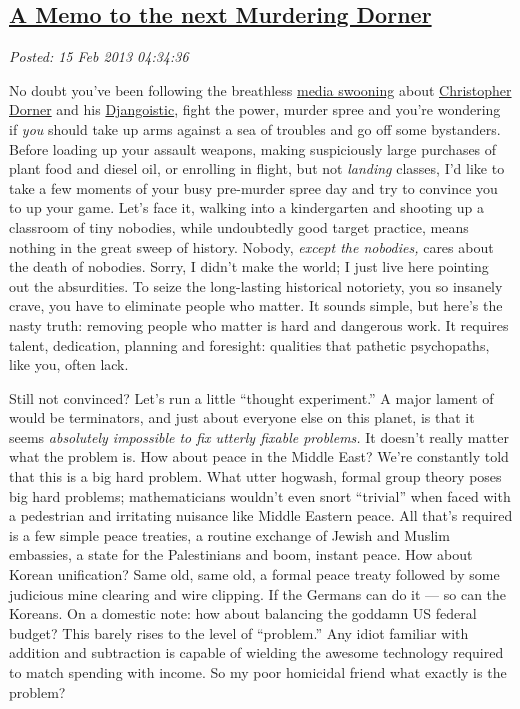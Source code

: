 %

\subsection*{\href{https://bakerjd99.wordpress.com/2013/02/14/a-memo-to-the-next-murdering-dorner/}{A Memo to the next Murdering Dorner}}


\noindent\emph{Posted: 15 Feb 2013 04:34:36}
\vspace{6pt}

No doubt you've been following the breathless
\href{http://patdollard.com/2013/02/chris-matthews-heaps-praise-on-chris-dorner-returning-favor/}{media
swooning} about
\href{http://www.thedailybeast.com/articles/2013/02/14/how-christopher-dorner-went-down.html}{Christopher
Dorner} and his
\href{http://www.mediaite.com/tv/cnn-panelists-dorners-exciting-rampage-like-watching-django-exact-revenge-for-police-brutality/}{Djangoistic},
fight the power, murder spree and you're wondering if \emph{you} 
should take up arms against a sea of troubles and go off some
bystanders. Before loading up your assault weapons, making suspiciously
large purchases of plant food and diesel oil, or enrolling in flight,
but not \emph{landing} classes, I'd like to take a few moments of your
busy pre-murder spree day and try to convince you to up your game. Let's
face it, walking into a kindergarten and shooting up a classroom of tiny
nobodies, while undoubtedly good target practice, means nothing in the
great sweep of history. Nobody, \emph{except the nobodies,} cares about
the death of nobodies. Sorry, I didn't make the world; I just live here
pointing out the absurdities. To seize the long-lasting historical
notoriety, you so insanely crave, you have to eliminate people who
matter. It sounds simple, but here's the nasty truth: removing people
who matter is hard and dangerous work. It requires talent, dedication,
planning and foresight: qualities that pathetic psychopaths, like you,
often lack.

Still not convinced? Let's run a little ``thought experiment.'' A major
lament of would be terminators, and just about everyone else on this
planet, is that it seems \emph{absolutely impossible to fix utterly
fixable problems.} It doesn't really matter what the problem is. How
about peace in the Middle East? We're constantly told that this is a big
hard problem. What utter hogwash, formal group theory poses big hard
problems; mathematicians wouldn't even snort ``trivial'' when faced with
a pedestrian and irritating nuisance like Middle Eastern peace. All
that's required is a few simple peace treaties, a routine exchange of
Jewish and Muslim embassies, a state for the Palestinians and boom,
instant peace. How about Korean unification? Same old, same old, a
formal peace treaty followed by some judicious mine clearing and wire
clipping. If the Germans can do it --- so can the Koreans. On a domestic
note: how about balancing the goddamn US federal budget? This barely
rises to the level of ``problem.'' Any idiot familiar with addition and
subtraction is capable of wielding the awesome technology required to
match spending with income. So my poor homicidal friend what exactly is
the problem?

